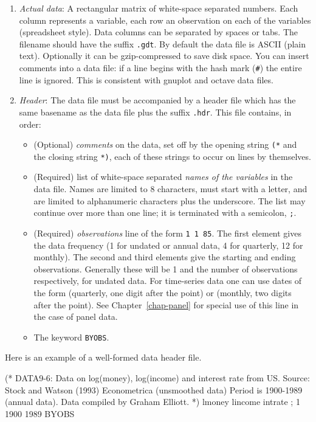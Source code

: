 \begin{enumerate}
\item \emph{Actual data}: A rectangular matrix of white-space
  separated numbers.  Each column represents a variable, each row an
  observation on each of the variables (spreadsheet style). Data
  columns can be separated by spaces or tabs. The filename should have
  the suffix \verb+.gdt+.  By default the data file is ASCII (plain
  text).  Optionally it can be gzip-compressed to save disk space. You
  can insert comments into a data file: if a line begins with the hash
  mark (\verb+#+) the entire line is ignored. This is consistent with
  gnuplot and octave data files.
\item \emph{Header}: The data file must be accompanied by a header
  file which has the same basename as the data file plus the suffix
  \verb+.hdr+.  This file contains, in order:
  \begin{itemize}
  \item (Optional) \emph{comments} on the data, set off by the opening
    string \verb+(*+ and the closing string \verb+*)+, each of these
    strings to occur on lines by themselves.
  \item (Required) list of white-space separated \emph{names of the
      variables} in the data file. Names are limited to 8 characters,
    must start with a letter, and are limited to alphanumeric
    characters plus the underscore.  The list may continue over more
    than one line; it is terminated with a semicolon, \verb+;+.
  \item (Required) \emph{observations} line of the form \verb+1 1 85+.
    The first element gives the data frequency (1 for undated or
    annual data, 4 for quarterly, 12 for monthly).  The second and
    third elements give the starting and ending observations.
    Generally these will be 1 and the number of observations
    respectively, for undated data.  For time-series data one can use
    dates of the form  (quarterly, one digit after the
    point) or  (monthly, two digits after the point).
    See Chapter~\ref{chap-panel} for special use of this line in the
    case of panel data.
  \item The keyword \verb+BYOBS+.
  \end{itemize}
\end{enumerate}

Here is an example of a well-formed data header file.

\begin{code} 
      (* 
        DATA9-6: 
        Data on log(money), log(income) and interest rate from US. 
        Source: Stock and Watson (1993) Econometrica 
        (unsmoothed data) Period is 1900-1989 (annual data). 
        Data compiled by Graham Elliott. 
      *) 
      lmoney lincome intrate ; 
      1 1900 1989 BYOBS
\end{code}

